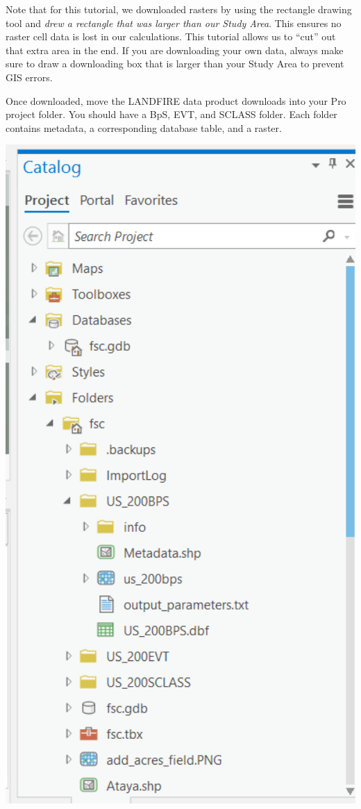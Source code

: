 \documentclass[
]{book}
\begin{document}
Note that for this tutorial, we downloaded rasters by using the rectangle drawing tool and \emph{drew a rectangle that was larger than our Study Area}. This ensures no raster cell data is lost in our calculations. This tutorial allows us to ``cut'' out that extra area in the end. If you are downloading your own data, always make sure to draw a downloading box that is larger than your Study Area to prevent GIS errors.

Once downloaded, move the LANDFIRE data product downloads into your Pro project folder. You should have a BpS, EVT, and SCLASS folder. Each folder contains metadata, a corresponding database table, and a raster.

\includegraphics[width=500pt]{04_gis_screenshots/3_fsc_pro_poject_catalog}
\end{document}
